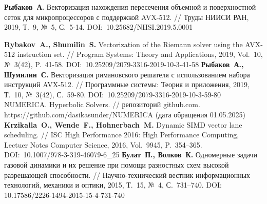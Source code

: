\begin{thebibliography}{99}
%
%



%
\textbf{Рыбаков~А.} Векторизация нахождения пересечения объемной и поверхностной сеток для микропроцессоров с поддержкой AVX-512. // Труды НИИСИ РАН, 2019, Т.~9, №~5, С.~5-14. DOI:~10.25682/NIISI.2019.5.0001
%



%
\textbf{Rybakov~A., Shumilin~S.} Vectorization of the Riemann solver using the AVX-512 instruction set. // Program Systems: Theory and Applications, 2019, Vol.~10, №~3(42), P.~41-58. DOI:~10.25209/2079-3316-2019-10-3-41-58
%
\textbf{Рыбаков~А., Шумилин~С.} Векторизация римановского решателя с использованием набора инструкций AVX-512. // Программные системы: Теория и приложения, 2019, Т.~10, №~3(42), С.~59-80. DOI:~10.25209/2079-3316-2019-10-3-59-80
%
NUMERICA. Hyperbolic Solvers. // репозиторий github.com. https://github.com/dasikasunder/NUMERICA (дата обращения 01.05.2025)
%
\textbf{Krzikalla~O., Wende~F., Hohnerbach~M.} Dynamic SIMD vector lane scheduling. // ISC High Performance 2016: High Performance Computing, Lectuer Notes Computer Science, 2016, Vol.~9945, P.~354–365. DOI:~10.1007/978-3-319-46079-6\_25
%
\textbf{Булат~П., Волков~К.} Одномерные задачи газовой динамики и их решение при помощи разностных схем высокой разрешающей способности. // Научно-технический вестник информационных технологий, механики и оптики, 2015, Т.~15, №~4, С.~731–740. DOI:~ 10.17586/2226-1494-2015-15-4-731-740
%




\end{thebibliography}
